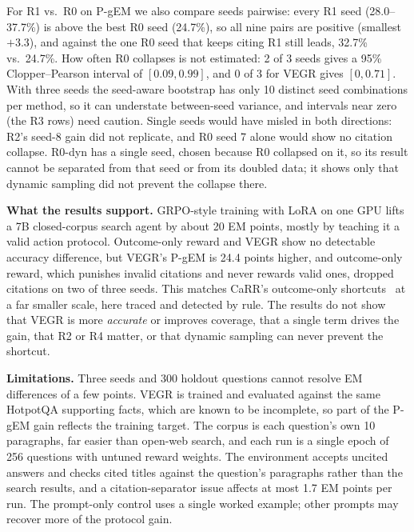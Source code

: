 \documentclass[conference]{IEEEtran}
\newcommand{\pgem}{P-gEM}
\begin{document}
For R1 vs.\ R0 on \pgem{} we also compare seeds pairwise: every R1 seed (28.0--37.7\%) is above the best R0 seed (24.7\%), so all nine pairs are positive (smallest $+3.3$), and against the one R0 seed that keeps citing R1 still leads, 32.7\% vs.\ 24.7\%. How often R0 collapses is not estimated: 2 of 3 seeds gives a 95\% Clopper--Pearson interval of $[0.09, 0.99]$, and 0 of 3 for VEGR gives $[0, 0.71]$. With three seeds the seed-aware bootstrap has only 10 distinct seed combinations per method, so it can understate between-seed variance, and intervals near zero (the R3 rows) need caution. Single seeds would have misled in both directions: R2's seed-8 gain did not replicate, and R0 seed 7 alone would show no citation collapse. R0-dyn has a single seed, chosen because R0 collapsed on it, so its result cannot be separated from that seed or from its doubled data; it shows only that dynamic sampling did not prevent the collapse there.

\textbf{What the results support.} GRPO-style training with LoRA on one GPU lifts a 7B closed-corpus search agent by about 20 EM points, mostly by teaching it a valid action protocol. Outcome-only reward and VEGR show no detectable accuracy difference, but VEGR's \pgem{} is 24.4 points higher, and outcome-only reward, which punishes invalid citations and never rewards valid ones, dropped citations on two of three seeds. This matches CaRR's outcome-only shortcuts~\cite{zhang2026carr} at a far smaller scale, here traced and detected by rule. The results do not show that VEGR is more \emph{accurate} or improves coverage, that a single term drives the gain, that R2 or R4 matter, or that dynamic sampling can never prevent the shortcut.

\textbf{Limitations.} Three seeds and 300 holdout questions cannot resolve EM differences of a few points. VEGR is trained and evaluated against the same HotpotQA supporting facts, which are known to be incomplete, so part of the \pgem{} gain reflects the training target. The corpus is each question's own 10 paragraphs, far easier than open-web search, and each run is a single epoch of 256 questions with untuned reward weights. The environment accepts uncited answers and checks cited titles against the question's paragraphs rather than the search results, and a citation-separator issue affects at most 1.7 EM points per run. The prompt-only control uses a single worked example; other prompts may recover more of the protocol gain.
\end{document}
